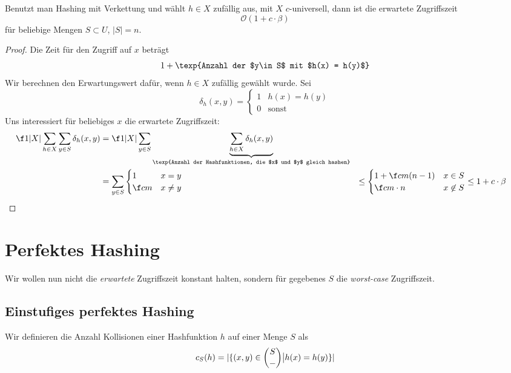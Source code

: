 \documentclass[11pt]{scrbook}
\renewcommand{\O}{\mathcal{O}}
\begin{document}
\begin{st}
	Benutzt man Hashing mit Verkettung und wählt $h\in X$ zufällig aus, mit $X$ $c$-universell,
	dann ist die erwartete Zugriffszeit
	\[
		\O(1+c\cdot \beta)
	\]
	für beliebige Mengen $S\subset U$, $|S|=n$.
	\begin{proof}
		Die Zeit für den Zugriff auf $x$ beträgt
		\[
			1 + \texp{Anzahl der $y\in S$ mit $h(x) = h(y)$}
		\]
		Wir berechnen den Erwartungswert dafür, wenn $h\in X$ zufällig gewählt wurde.
		Sei
		\[
			\delta_h  (x,y) = \begin{cases}1 & h(x) = h(y)\\ 0& \text{sonst}\end{cases}
		\]
		Uns interessiert für beliebiges $x$ die erwartete Zugriffszeit:
		\begin{align*}
			\f 1{|X|}\sum_{h\in X} \sum_{y\in S} \delta_h(x,y) &= 
			\f 1{|X|}\sum_{y\in S} \underbrace{\sum_{h\in X} \delta_h(x,y)}_{\texp{Anzahl der Hashfunktionen, die $x$ und $y$ gleich hashen}} \\
			&= \sum_{y\in S} \begin{cases} 1 & x=y \\ \f cm & x\neq y\end{cases}
			&\le  \begin{cases} 1 + \f cm (n-1) & x\in S\\ \f cm\cdot n & x\not \in S\end{cases}
			&\le 1 + c\cdot \beta
		\end{align*}
	\end{proof}
\end{st}


\section{Perfektes Hashing}

Wir wollen nun nicht die \emph{erwartete} Zugriffszeit konstant halten, sondern für gegebenes $S$ die \emph{worst-case} Zugriffszeit.

\subsection{Einstufiges perfektes Hashing}

\begin{df}
	Wir definieren die Anzahl Kollisionen einer Hashfunktion $h$ auf einer Menge $S$ als
	\[
		c_S(h) = |\{(x,y) \in \binom{S}{\--} \big| h(x)=h(y)\}|
	\]
\end{df}
\end{document}
